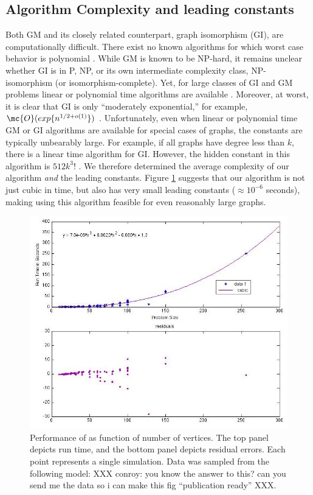 \documentclass[10pt,journal,cspaper,compsoc]{IEEEtran}
\begin{document}


\subsection{Algorithm Complexity and leading constants} %
\label{sub:algorithm_complexity_and_leading_constants}

Both GM and its closely related counterpart, graph isomorphism (GI), are computationally difficult.  There exist no known algorithms for which worst case behavior is polynomial \cite{Fortin1996}.  While GM is known to be NP-hard, it remains unclear whether GI is in P, NP, or its own intermediate complexity class, NP-isomorphism (or isomorphism-complete).  Yet, for large classes of GI and GM problems linear or polynomial time algorithms are available \cite{Babai1980}.  Moreover, at worst, it is clear that GI is only ``moderately exponential,'' for example, $\mc{O}(exp\{n^{1/2 + o(1)}\})$ \cite{Babai1981}.  Unfortunately, even when linear or polynomial time GM or GI algorithms are available for special cases of graphs, the constants are typically unbearably large.  For example, if all graphs have degree less than $k$, there is a linear time algorithm for GI.  However, the hidden constant in this algorithm is $512k^3!$ \cite{Chen1994}.  We therefore determined the average complexity of our algorithm \emph{and} the leading constants.  Figure \ref{fig:scaling} suggests that our algorithm is not just cubic in time, but also has very small leading constants ($\approx 10^{-6}$ seconds), making using this algorithm feasible for even reasonably large graphs.




\begin{figure}[htbp]
	\centering			
	\includegraphics[width=1.0\linewidth]{../figs/scaling_law.jpg}
	\caption{Performance of \qap as function of number of vertices.  The top panel depicts run time, and the bottom panel depicts residual errors.  Each point represents a single simulation.  Data was sampled from the following model: XXX conroy: you know the answer to this? can you send me the data so i can make this fig ``publication ready'' XXX.}
	\label{fig:scaling}
\end{figure}
\end{document}
